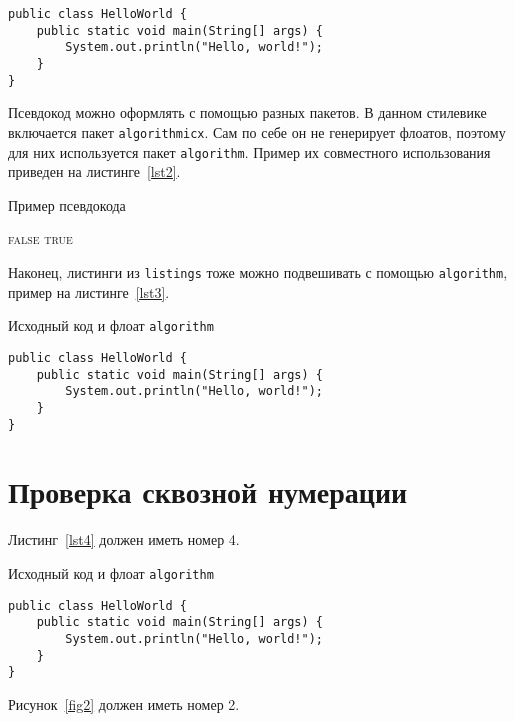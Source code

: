 \documentclass[times,numbers=noenddot]{itmo-student-thesis}
\begin{document}
\begin{lstlisting}[float=!h,caption={Пример исходного кода на Java},label={lst1}]
public class HelloWorld {
    public static void main(String[] args) {
        System.out.println("Hello, world!");
    }
}
\end{lstlisting}

Псевдокод можно оформлять с помощью разных пакетов. В данном стилевике включается пакет \texttt{algorithmicx}.
Сам по себе он не генерирует флоатов, поэтому для них используется пакет \texttt{algorithm}.
Пример их совместного использования приведен на листинге~\ref{lst2}.

\begin{algorithm}[!h]
	\caption{Пример псевдокода}\label{lst2}
	\begin{algorithmic}
		\State\Return \textsc{false}
		\EndIf
		\EndFor
		\State\Return \textsc{true}
		\EndFunction
	\end{algorithmic}
\end{algorithm}

Наконец, листинги из \texttt{listings} тоже можно подвешивать с помощью \texttt{algorithm},
пример на листинге~\ref{lst3}.

\begin{algorithm}[!h]
	\caption{Исходный код и флоат \texttt{algorithm}}\label{lst3}
	\begin{lstlisting}
public class HelloWorld {
    public static void main(String[] args) {
        System.out.println("Hello, world!");
    }
}
\end{lstlisting}
\end{algorithm}

\chapter{Проверка сквозной нумерации}

Листинг~\ref{lst4} должен иметь номер 4.

\begin{algorithm}[!h]
	\caption{Исходный код и флоат \texttt{algorithm}}\label{lst4}
	\begin{lstlisting}
public class HelloWorld {
    public static void main(String[] args) {
        System.out.println("Hello, world!");
    }
}
\end{lstlisting}
\end{algorithm}

Рисунок~\ref{fig2} должен иметь номер 2.
\end{document}
